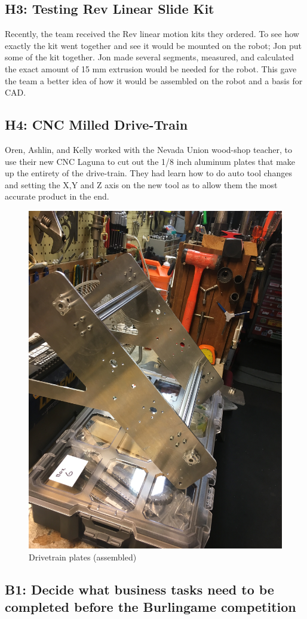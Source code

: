 \documentclass{article}
\begin{document}
\subsection{H3: Testing Rev Linear Slide Kit}

Recently, the team received the Rev linear motion kits they ordered. To see how exactly the kit went together and see it would be mounted on the robot; Jon put some of the kit together. Jon made several segments, measured, and calculated the exact amount of 15 mm extrusion would be needed for the robot. This gave the team a better idea of how it would be assembled on the robot and a basis for CAD.

\subsection{H4: CNC Milled Drive-Train }

Oren, Ashlin, and Kelly worked with the Nevada Union wood-shop teacher, to use their new CNC Laguna to cut out the 1/8 inch aluminum plates that make up the entirety of the drive-train. They had learn how to do auto tool changes and setting the X,Y and Z axis on the new tool as to allow them the most accurate product in the end.

\begin{figure}
    \centering
    \includegraphics[width=.6 \textwidth]{07_10-15/images/drivetrain.JPG}
    \caption{Drivetrain plates (assembled)}
    \label{fig:plates}
\end{figure}
\subsection{B1: Decide what business tasks need to be completed before the Burlingame competition}
\end{document}
